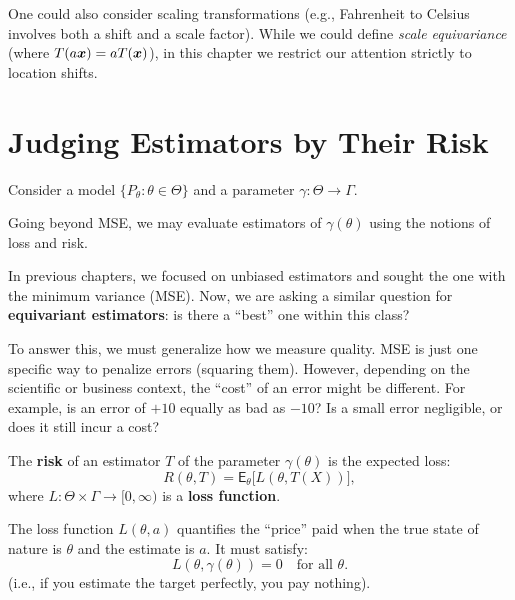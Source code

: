 \begin{note}
One could also consider scaling transformations (e.g., Fahrenheit to Celsius involves both a shift and a scale factor). While we could define \textit{scale equivariance} (where \(T(a\boldsymbol{x}) = aT(\boldsymbol{x})\)), in this chapter we restrict our attention strictly to location shifts.
\end{note}

\section{Judging Estimators by Their Risk}
\label{sec:judging_estimators}

Consider a model \(\{P_{\theta} : \theta \in \Theta\}\) and a parameter \(\gamma : \Theta \to \Gamma\).

Going beyond MSE, we may evaluate estimators of \(\gamma(\theta)\) using the notions of loss and risk.

In previous chapters, we focused on unbiased estimators and sought the one with the minimum variance (MSE). Now, we are asking a similar question for \textbf{equivariant estimators}: is there a ``best'' one within this class?

To answer this, we must generalize how we measure quality. MSE is just one specific way to penalize errors (squaring them). However, depending on the scientific or business context, the ``cost'' of an error might be different. For example, is an error of $+10$ equally as bad as $-10$? Is a small error negligible, or does it still incur a cost?

\begin{definition}
The \textbf{risk} of an estimator \(T\) of the parameter \(\gamma(\theta)\) is the expected loss:
\[
R(\theta, T) = \mathsf{E}_{\theta} \big[ L(\theta, T(X)) \big],
\]
where \(L: \Theta \times \Gamma \to [0, \infty)\) is a \textbf{loss function}.

The loss function \(L(\theta, a)\) quantifies the ``price'' paid when the true state of nature is \(\theta\) and the estimate is \(a\). It must satisfy:
\[
L(\theta, \gamma(\theta)) = 0 \quad \text{for all } \theta.
\]
(i.e., if you estimate the target perfectly, you pay nothing).
\end{definition}

\medskip

